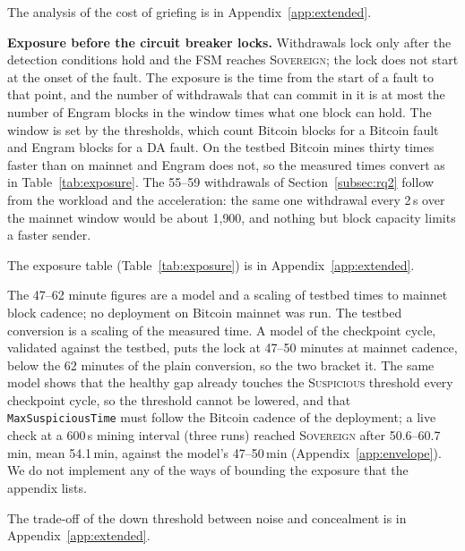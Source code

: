 The analysis of the cost of griefing is in Appendix~\ref{app:extended}.

\textbf{Exposure before the circuit breaker locks.} Withdrawals lock only after
the detection conditions hold and the FSM reaches \textsc{Sovereign}; the lock
does not start at the onset of the fault. The exposure is the time from the start of a
fault to that point, and the number of withdrawals that can commit in it is at
most the number of Engram blocks in the window times what one block can hold.
The window is set by the thresholds, which count Bitcoin blocks for a Bitcoin
fault and Engram blocks for a DA fault. On the testbed Bitcoin mines thirty
times faster than on mainnet and Engram does not, so the measured times convert
as in Table~\ref{tab:exposure}. The
55--59 withdrawals of Section~\ref{subsec:rq2} follow from the workload and the
acceleration: the same one withdrawal every 2\,s over the mainnet window would
be about 1{,}900, and nothing but block capacity limits a faster sender.

The exposure table (Table~\ref{tab:exposure}) is in Appendix~\ref{app:extended}.

The 47--62 minute figures are a model and a scaling of testbed times to mainnet block cadence; no deployment on Bitcoin mainnet was run. The testbed conversion is a scaling of the measured time. A model of the
checkpoint cycle, validated against the testbed, puts the lock at 47--50 minutes at
mainnet cadence, below the 62 minutes of the plain conversion, so the two bracket
it. The same model shows that the healthy gap already touches the
\textsc{Suspicious} threshold every checkpoint cycle, so the threshold cannot be
lowered, and that \texttt{MaxSuspiciousTime} must follow the Bitcoin cadence of the
deployment; a live check at a 600\,s mining interval (three runs) reached \textsc{Sovereign} after 50.6--60.7\,min, mean 54.1\,min, against the model's 47--50\,min (Appendix~\ref{app:envelope}). We do not implement any of the ways of
bounding the exposure that the appendix lists.

The trade-off of the down threshold between noise and concealment is in Appendix~\ref{app:extended}.

